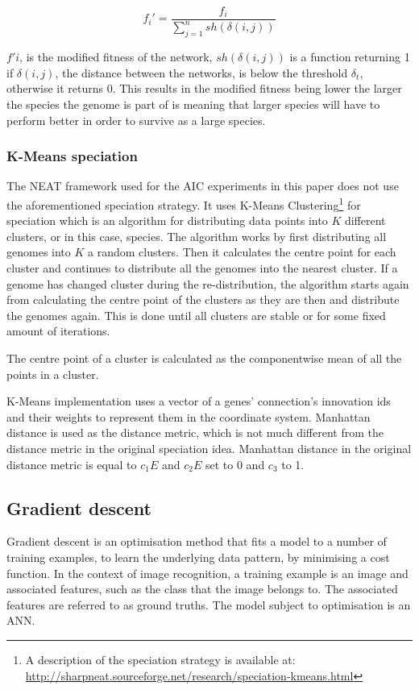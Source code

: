 $$f_i' = \frac{f_i}{\sum^n_{j=1} sh(\delta(i,j))}$$

$f'i$, is the modified fitness of the network, $sh(\delta(i,j))$ is a function returning 1 if $\delta(i,j)$, the distance between the networks, is below the threshold $\delta_t$, otherwise it returns 0. This results in the modified fitness being lower the larger the species the genome is part of is meaning that larger species will have to perform better in order to survive as a large species.

\subsubsection{K-Means speciation} 
The NEAT framework used for the AIC experiments in this paper does not use the aforementioned speciation strategy. It uses K-Means Clustering\footnote{A description of the speciation strategy is available at: \url{http://sharpneat.sourceforge.net/research/speciation-kmeans.html}} for speciation which is an algorithm for distributing data points into $K$ different clusters, or in this case, species. The algorithm works by first distributing all genomes into $K$ a random clusters. Then it calculates the centre point for each cluster and continues to distribute all the genomes into the nearest cluster. If a genome has changed cluster during the re-distribution, the algorithm starts again from calculating the centre point of the clusters as they are then and distribute the genomes again. This is done until all clusters are stable or for some fixed amount of iterations.

The centre point of a cluster is calculated as the componentwise mean of all the points in a cluster.

K-Means implementation uses a vector of a genes' connection's innovation ids and their weights to represent them in the coordinate system. Manhattan distance is used as the distance metric, which is not much different from the distance metric in the original speciation idea. Manhattan distance in the original distance metric is equal to ${c_1E}$ and ${c_2E}$ set to 0 and $c_3$ to 1.

\subsection{Gradient descent}
Gradient descent is an optimisation method that fits a model to a number of training examples, to learn the underlying data pattern, by minimising a cost function. In the context of image recognition, a training example is an image and associated features, such as the class that the image belongs to. The associated features are referred to as ground truths. The model subject to optimisation is an ANN.

